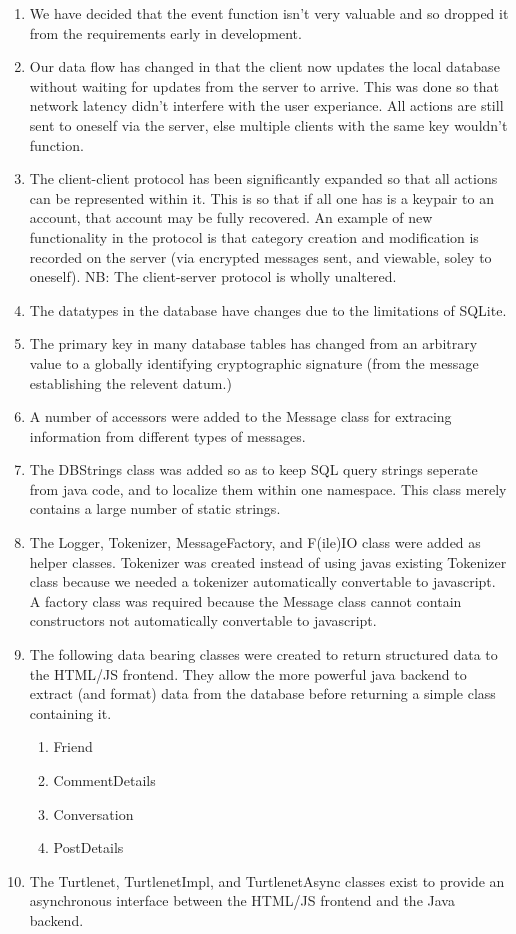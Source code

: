 \begin{enumerate}
\item We have decided that the event function isn't very valuable and so dropped it
from the requirements early in development.

\item Our data flow has changed in that the client now updates the local
database without waiting for updates from the server to arrive. This was done so
that network latency didn't interfere with the user experiance. All actions are
still sent to oneself via the server, else multiple clients with the same key
wouldn't function.

\item The client-client protocol has been significantly expanded so that all
actions can be represented within it. This is so that if all one has is a
keypair to an account, that account may be fully recovered. An example of new
functionality in the protocol is that category creation and modification is
recorded on the server (via encrypted messages sent, and viewable, soley to
oneself). NB: The client-server protocol is wholly unaltered.

\item The datatypes in the database have changes due to the limitations of
SQLite.

\item The primary key in many database tables has changed from an arbitrary
value to a globally identifying cryptographic signature (from the message
establishing the relevent datum.)

\item A number of accessors were added to the Message class for extracing
information from different types of messages.

\item The DBStrings class was added so as to keep SQL query strings seperate
from java code, and to localize them within one namespace. This class merely
contains a large number of static strings.

\item The Logger, Tokenizer,  MessageFactory, and F(ile)IO class were added as
helper classes. Tokenizer was created instead of using javas existing Tokenizer
class because we needed a tokenizer automatically convertable to javascript. A
factory class was required because the Message class cannot contain constructors
not automatically convertable to javascript.

\item The following data bearing classes were created to return structured data
to the HTML/JS frontend. They allow the more powerful java backend to extract
(and format) data from the database before returning a simple class containing
it.
\begin{enumerate}
\item Friend
\item CommentDetails
\item Conversation
\item PostDetails
\end{enumerate}

\item The Turtlenet, TurtlenetImpl, and TurtlenetAsync classes exist to provide
an asynchronous interface between the HTML/JS frontend and the Java backend.
\end{enumerate}

